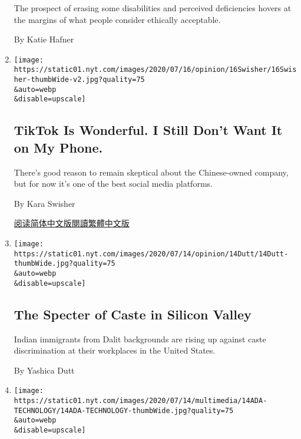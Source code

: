 \begin{enumerate}
  The prospect of erasing some disabilities and perceived deficiencies
  hovers at the margins of what people consider ethically acceptable.

  By Katie Hafner
\item
  \href{/2020/07/17/opinion/tiktok-ban-china.html}{}

  \texttt{[image: https://static01.nyt.com/images/2020/07/16/opinion/16Swisher/16Swisher-thumbWide-v2.jpg?quality=75\\\&auto=webp\\\&disable=upscale]}

  \hypertarget{tiktok-is-wonderful-i-still-dont-want-it-on-my-phone}{%
  \subsection{TikTok Is Wonderful. I Still Don't Want It on My
  Phone.}\label{tiktok-is-wonderful-i-still-dont-want-it-on-my-phone}}

  There's good reason to remain skeptical about the Chinese-owned
  company, but for now it's one of the best social media platforms.

  By Kara Swisher

  \href{https://cn.nytimes.com/opinion/20200720/tiktok-ban-china/}{阅读简体中文版}\href{https://cn.nytimes.com/opinion/20200720/tiktok-ban-china/zh-hant/}{閱讀繁體中文版}
\item
  \href{/2020/07/14/opinion/caste-cisco-indian-americans-discrimination.html}{}

  \texttt{[image: https://static01.nyt.com/images/2020/07/14/opinion/14Dutt/14Dutt-thumbWide.jpg?quality=75\\\&auto=webp\\\&disable=upscale]}

  \hypertarget{the-specter-of-caste-in-silicon-valley}{%
  \subsection{The Specter of Caste in Silicon
  Valley}\label{the-specter-of-caste-in-silicon-valley}}

  Indian immigrants from Dalit backgrounds are rising up against caste
  discrimination at their workplaces in the United States.

  By Yashica Dutt
\item
  \href{/2020/07/14/style/assistive-technology.html}{}

  \texttt{[image: https://static01.nyt.com/images/2020/07/14/multimedia/14ADA-TECHNOLOGY/14ADA-TECHNOLOGY-thumbWide.jpg?quality=75\\\&auto=webp\\\&disable=upscale]}

  \hypertarget{disabled-do-it-yourselfers-lead-way-to-technology-gains}{%
}
\end{enumerate}
